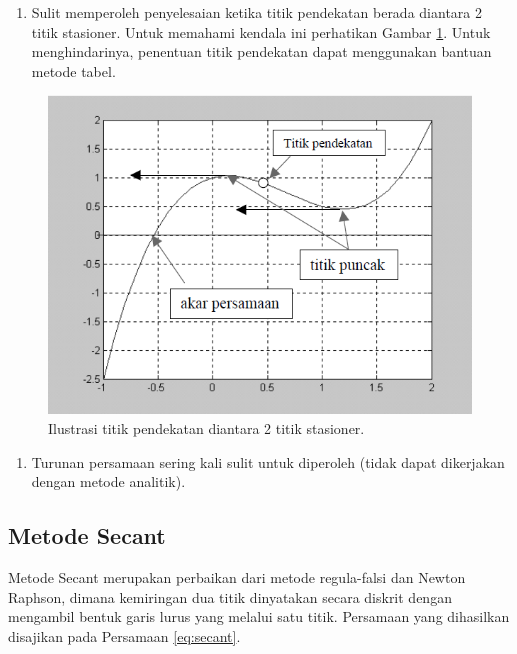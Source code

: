 \documentclass[]{book}
\providecommand{\tightlist}{%
  \setlength{\itemsep}{0pt}\setlength{\parskip}{0pt}}
\theoremstyle{definition}
\theoremstyle{definition}
\theoremstyle{definition}
\theoremstyle{remark}
\begin{document}
\begin{enumerate}
\def\labelenumi{\arabic{enumi}.}
\setcounter{enumi}{1}
\tightlist
\item
  Sulit memperoleh penyelesaian ketika titik pendekatan berada diantara 2 titik stasioner. Untuk memahami kendala ini perhatikan Gambar \ref{fig:nrviz3}. Untuk menghindarinya, penentuan titik pendekatan dapat menggunakan bantuan metode tabel.
\end{enumerate}

\begin{figure}

{\centering \includegraphics[width=0.9\linewidth]{./images/nrviz3} 

}

\caption{Ilustrasi titik pendekatan diantara 2 titik stasioner.}\label{fig:nrviz3}
\end{figure}

\begin{enumerate}
\def\labelenumi{\arabic{enumi}.}
\setcounter{enumi}{2}
\tightlist
\item
  Turunan persamaan sering kali sulit untuk diperoleh (tidak dapat dikerjakan dengan metode analitik).
\end{enumerate}

\hypertarget{secant}{%
\subsection{Metode Secant}\label{secant}}

Metode Secant merupakan perbaikan dari metode regula-falsi dan Newton Raphson, dimana kemiringan dua titik dinyatakan secara diskrit dengan mengambil bentuk garis lurus yang melalui satu titik. Persamaan yang dihasilkan disajikan pada Persamaan \eqref{eq:secant}.
\end{document}
